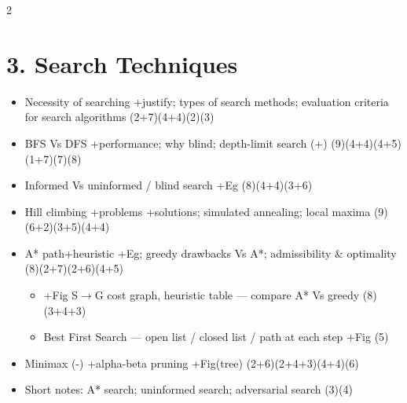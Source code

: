 \documentclass[10pt]{article}
\begin{document}
\begin{multicols}{2}
\section*{3. Search Techniques}
\begin{itemize}
  \item Necessity of searching +justify; types of search methods; evaluation criteria for search algorithms \hfill (2+7)(4+4)(2)(3)
  \item BFS Vs DFS +performance; why blind; depth-limit search (+) \hfill (9)(4+4)(4+5)(1+7)(7)(8)
  \item Informed Vs uninformed / blind search +Eg \hfill (8)(4+4)(3+6)
  \item Hill climbing +problems +solutions; simulated annealing; local maxima \hfill (9)(6+2)(3+5)(4+4)
  \item A* path+heuristic +Eg; greedy drawbacks Vs A*; admissibility \& optimality \hfill (8)(2+7)(2+6)(4+5)
    \begin{itemize}
      \item +Fig S$\to$G cost graph, heuristic table --- compare A* Vs greedy \hfill (8)(3+4+3)
      \item Best First Search --- open list / closed list / path at each step +Fig \hfill (5)
    \end{itemize}
  \item Minimax (-) +alpha-beta pruning +Fig(tree) \hfill (2+6)(2+4+3)(4+4)(6)
  \item Short notes: A* search; uninformed search; adversarial search \hfill (3)(4)
\end{itemize}


\end{multicols}
\end{document}
